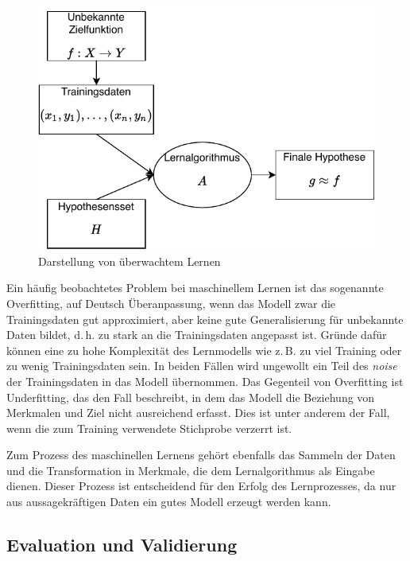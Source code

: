 	\begin{figure}[H]
		\centering
		\includegraphics[scale=1]{pic/SupervisedLearning.pdf}
		\caption[Darstellung von überwachtem Lernen]{Darstellung von überwachtem Lernen}
		\label{fig:supervisedLearning}
	\end{figure}

	
	Ein häufig beobachtetes Problem bei maschinellem Lernen ist das sogenannte Overfitting, auf Deutsch Überanpassung, wenn das Modell zwar die Trainingsdaten gut approximiert, aber keine gute Generalisierung für unbekannte Daten bildet, d.\,h. zu stark an die Trainingsdaten angepasst ist. Gründe dafür können eine zu hohe Komplexität des Lernmodells wie z.\,B. zu viel Training oder zu wenig Trainingsdaten sein. %
	In beiden Fällen wird ungewollt ein Teil des \textit{noise} %
	der Trainingsdaten in das Modell übernommen. Das Gegenteil von Overfitting ist Underfitting, das den Fall beschreibt, in dem das Modell die Beziehung von Merkmalen und Ziel nicht ausreichend erfasst. Dies ist unter anderem der Fall, wenn die zum Training verwendete Stichprobe verzerrt ist.
	
	Zum Prozess des maschinellen Lernens gehört ebenfalls das Sammeln der Daten und die Transformation in Merkmale, die dem Lernalgorithmus als Eingabe dienen. Dieser Prozess ist entscheidend für den Erfolg des Lernprozesses, da nur aus aussagekräftigen Daten ein gutes Modell erzeugt werden kann.

	\subsection{Evaluation und Validierung}
	
